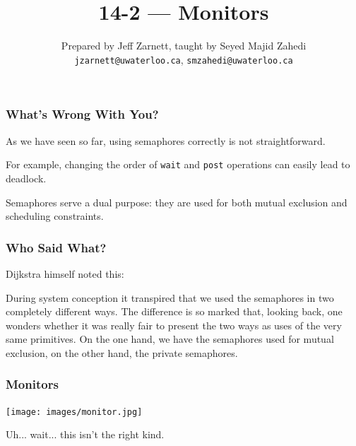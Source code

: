 

\title{14-2 --- Monitors }

\author{Prepared by Jeff Zarnett, taught by Seyed Majid Zahedi \\ \small \texttt{jzarnett@uwaterloo.ca}, \texttt{smzahedi@uwaterloo.ca}}
\date{}




\begin{frame}
	\titlepage

\end{frame}

\begin{frame}
	\frametitle{What's Wrong With You?}

	As we have seen so far, using semaphores correctly is not straightforward.

	For example, changing the order of \texttt{wait} and \texttt{post} operations can easily lead to deadlock.

	Semaphores serve a dual purpose: they are used for both \alert{mutual exclusion} and \alert{scheduling constraints}.

\end{frame}

\begin{frame}
	\frametitle{Who Said What?}

	Dijkstra himself noted this:

	\vspace{1em}
	\begin{displayquote}
    	During system conception it transpired that we used the semaphores in two completely different ways.
    	The difference is so marked that, looking back, one wonders whether it was really fair to present the two ways as uses of the very same primitives.
    	On the one hand, we have the semaphores used for mutual exclusion, on the other hand, the private semaphores.
	\end{displayquote}

\end{frame}

\begin{frame}
	\frametitle{Monitors}
	\begin{center}
		\texttt{[image: images/monitor.jpg]}
	\end{center}

	Uh... wait... this isn't the right kind.

\end{frame}

